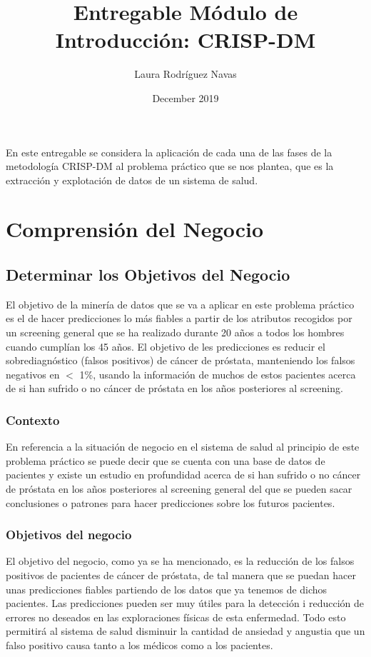 \documentclass{article}
\title{Entregable Módulo de Introducción: CRISP-DM}
\author{Laura Rodríguez Navas}
\date{December 2019}
\begin{document}
\maketitle

En este entregable se considera la aplicación de cada una de las fases de la metodología CRISP-DM al problema práctico que se nos plantea, que es la extracción y explotación de datos de un sistema de salud.

\section{Comprensión del Negocio}

\subsection{Determinar los Objetivos del Negocio}
El objetivo de la minería de datos que se va a aplicar en este problema práctico es el de hacer predicciones lo más fiables a partir de los atributos recogidos por un screening general que se ha realizado durante 20 años a todos los hombres cuando cumplían los 45 años. El objetivo de les predicciones es reducir el sobrediagnóstico (falsos positivos) de cáncer de próstata, manteniendo los falsos negativos en $<$ 1\%, usando la información de muchos de estos pacientes acerca de si han sufrido o no cáncer de próstata en los años posteriores al screening.

\subsubsection{Contexto}
En referencia a la situación de negocio en el sistema de salud al principio de este problema práctico se puede decir que se cuenta con una base de datos de pacientes y existe un estudio en profundidad acerca de si han sufrido o no cáncer de próstata en los años posteriores al screening general del que se pueden sacar conclusiones o patrones para hacer predicciones sobre los futuros pacientes.

\subsubsection{Objetivos del negocio}
El objetivo del negocio, como ya se ha mencionado, es la reducción de los falsos positivos de pacientes de cáncer de próstata, de tal manera que se puedan hacer unas predicciones fiables partiendo de los datos que ya tenemos de dichos pacientes. Las predicciones pueden ser muy útiles para la detección i reducción de errores no deseados en las exploraciones físicas de esta enfermedad. Todo esto permitirá al sistema de salud disminuir la cantidad de ansiedad y angustia que un falso positivo causa tanto a los médicos como a los pacientes.
	
\end{document}
